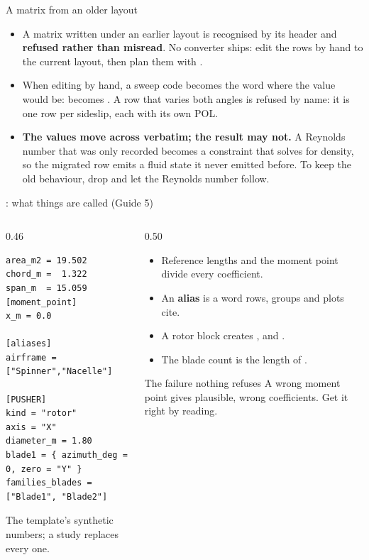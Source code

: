 \begin{frame}[fragile]{A matrix from an older layout}
\begin{itemize}\small
  \item A matrix written under an earlier layout is recognised by its header
        and \textbf{refused rather than misread}. No converter ships: edit the
        rows by hand to the current layout, then plan them with
        .
  \item When editing by hand, a sweep code becomes the word  where the value would be:
         becomes . A row that varies both angles is
        refused by name: it is one row per sideslip, each with its own POL.
  \item \textbf{The values move across verbatim; the result may not.} A
        Reynolds number that was only recorded becomes a constraint that
        solves for density, so the migrated row emits a fluid state it never
        emitted before. To keep the old behaviour, drop  and let the
        Reynolds number follow.
\end{itemize}
\end{frame}

\begin{frame}[fragile]{: what things are called (Guide 5)}
\begin{columns}[T]
\begin{column}{0.46\textwidth}
\begin{lstlisting}[style=ftsbase]
area_m2 = 19.502
chord_m =  1.322
span_m  = 15.059
[moment_point]
x_m = 0.0

[aliases]
airframe = ["Spinner","Nacelle"]

[PUSHER]
kind = "rotor"
axis = "X"
diameter_m = 1.80
blade1 = { azimuth_deg = 0, zero = "Y" }
families_blades = ["Blade1", "Blade2"]
\end{lstlisting}
{\tiny\color{SoftGray} The template's synthetic numbers; a study replaces every one.}
\end{column}
\begin{column}{0.50\textwidth}
\begin{itemize}\small
  \item Reference lengths and the moment point divide every coefficient.
  \item An \textbf{alias} is a word rows, groups and plots cite.
  \item A rotor block creates ,  and
        .
  \item The blade count is the length of .
\end{itemize}
\begin{alertblock}{The failure nothing refuses}
A wrong moment point gives plausible, wrong coefficients. Get it right by
reading.
\end{alertblock}
\end{column}
\end{columns}
\end{frame}

